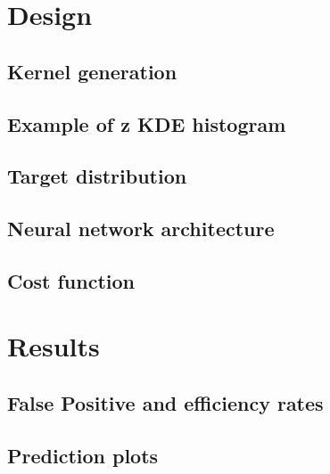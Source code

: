 \documentclass[aspectratio=169, 10pt]{beamer}
\begin{document}

\section{Design}

\subsection{Kernel generation}


\subsection{Example of z KDE histogram}


\subsection{Target distribution}


\subsection{Neural network architecture}


\subsection{Cost function}



\section{Results}

\subsection{False Positive and efficiency rates}


\subsection{Prediction plots}

\end{document}
